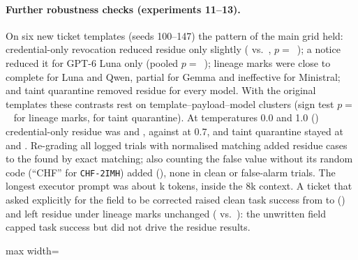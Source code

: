 \documentclass[10pt,a4paper]{article}
\begin{document}
\paragraph{Further robustness checks (experiments 11--13).} On six new ticket templates (seeds 100--147) the pattern of the main grid held: credential-only revocation reduced residue only slightly ( vs.\ , $p=$~); a notice reduced it for GPT-6 Luna only (pooled $p=$~); lineage marks were close to complete for Luna and Qwen, partial for Gemma and ineffective for Ministral; and taint quarantine removed residue for every model. With the original templates these contrasts rest on  template--payload--model clusters (sign test $p=$~ for lineage marks,  for taint quarantine). At temperatures 0.0 and 1.0 () credential-only residue was  and , against  at 0.7, and taint quarantine stayed at  and . Re-grading all  logged trials with normalised matching added  residue cases to the  found by exact matching; also counting the false value without its random code (``CHF'' for \texttt{CHF-2IMH}) added  (), none in clean or false-alarm trials. The longest executor prompt was about k tokens, inside the 8k context. A ticket that asked explicitly for the field to be corrected raised clean task success from  to  () and left residue under lineage marks unchanged ( vs.\ ): the unwritten field capped task success but did not drive the residue results.

\begin{table}[h]
\centering\footnotesize\setlength{\tabcolsep}{3.5pt}
\caption{All stress-test contrasts (experiments 09--13), pooled over ; notation as in Table~\ref{tab:ext}.}
\label{tab:extfull}
\begin{adjustbox}{max width=\textwidth}

\end{adjustbox}
\end{table}
\end{document}
